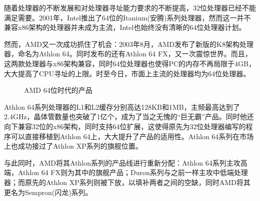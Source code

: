\documentclass[UTF8]{ctexart}
\begin{document}
随着处理器的不断发展和对处理器寻址能力要求的不断提高，32位处理器已经不能满足需要。2001年，Intel推出了64位的Itanium(安腾)系列处理器，然而这一并不兼容x86架构的处理器并未成为主流，Intel也始终没有清晰的64位处理器计划。

然而，AMD又一次成功抓住了机会：2003年8月，AMD发布了新版的K8架构处理器，命名为Athlon 64。同时发布的还有Athlon 64 FX，又一次震惊世界。而且，这两款处理器与x86架构兼容，同时64位处理器也使得PC的内存不再局限于4GB，大大提高了CPU寻址的上限。时至今日，市面上主流的处理器均为64位处理器。
\begin{figure}[H]
    \centering
    \caption{AMD 64位时代的产品}
\end{figure}
Athlon 64系列处理器的L1和L2缓存分别高达128KB和1MB，主频最高达到了2.4GHz，晶体管数量也突破了1亿个，成为了当之无愧的“巨无霸”产品。同时他还向下兼容32位的x86架构，同时支持64位扩展，这使得原先为32位处理器编写的程序可以直接移植到Athlon 64上，大大提升了产品的适用性。Athlon 64系列在市场上也成功接过了Athlon XP系列的旗舰位置。

与此同时，AMD将其Athlon系列的产品线进行重新分配：Athlon 64系列主攻高端，Athlon 64 FX则为其中的旗舰产品；Duron系列与之前一样主攻中低端处理器；而原先的Athlon XP系列则被下放，以填补两者之间的空缺，同时AMD将其更名为Sempron(闪龙)系列。
\end{document}
